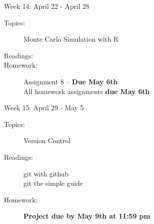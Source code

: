\documentclass[11pt,article,oneside]{memoir}
\newcounter{schedule}
\begin{document}
\begin{schedule}{Week 14: April 22 - April 28}
\begin{description}
\item[Topics:] Monte Carlo Simulation with R

\item[Readings:] 

\item[Homework:] Assignment 8 -- \textbf{Due May 6th} \\
 All homework assignments \textbf{due May 6th}

\end{description}
\end{schedule}
\begin{schedule}{Week 15: April 29 - May 5}
\begin{description}
\item[Topics:] Version Control

\item[Readings:] git with github \\ git the simple guide

\item[Homework:] \textbf{Project due by May 9th at 11:59 pm}

\end{description}
\end{schedule}
\end{document}
